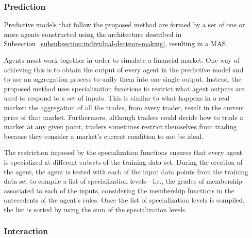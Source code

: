 \documentclass{ieeeaccess}
\begin{document}
\subsubsection{Prediction}
\label{subsubsection:prediction}

Predictive models that follow the proposed method are formed by a set of one or more agents constructed using the architecture described in Subsection~\ref{subsubsection:individual-decision-making}, resulting in a MAS.

Agents must work together in order to simulate a financial market. One way of achieving this is to obtain the output of every agent in the predictive model and to use an aggregation process to unify them into one single output. Instead, the proposed method uses specialization functions to restrict what agent outputs are used to respond to a set of inputs. This is similar to what happens in a real market: the aggregation of all the trades, from every trader, result in the current price of that market. Furthermore, although traders could decide how to trade a
market at any given point, traders sometimes restrict themselves from trading because they consider a market's current condition to not be ideal.

The restriction imposed by the specialization functions ensures that every agent is specialized at different subsets of the training data set. During the creation of the agent, the agent is tested with each of the input data points from the training data set to compile a list of specialization levels---i.e., the grades of membership associated to each of the inputs, considering the membership functions in the antecedents of the agent's rules. Once the list of specialization levels is compiled, the list is sorted by using the sum of the specialization
levels. 


\subsubsection{Interaction}
\label{subsubsection:interaction}
\end{document}
